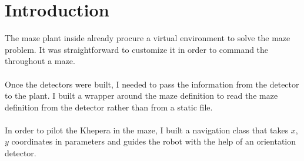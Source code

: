 \section{Introduction}

The maze plant inside \clsquare already procure a virtual environment to 
solve the maze problem. It was straightforward to customize it in order 
to command the \khepera throughout a maze. 
\\
\\
Once the detectors were built, I needed to pass the information from 
the detector to the plant. I built a wrapper around the maze definition 
to read the maze definition from the detector rather than from a static 
file. 
\\
\\
In order to pilot the Khepera in the maze, I built a navigation class 
that takes $x$, $y$ coordinates in parameters and guides the robot with the 
help of an orientation detector.
